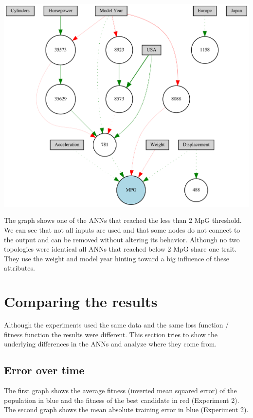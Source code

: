 \documentclass{llncs}
\begin{document}
\newline
\newline
\begin{center}
	\includegraphics[scale=0.45]{Topologie.png}
	\newline
\end{center}

%
The graph shows one of the ANNs that reached the less than 2 MpG threshold. We can see that not all inputs are used and that some nodes do not connect to the output and can be removed without altering its behavior. Although no two topologies were identical all ANNs that reached below 2 MpG share one trait. They use the weight and model year hinting toward a big influence of these attributes. 
%
\section{Comparing the results}
%
Although the experiments used the same data and the same loss function / fitness function the results were different. This section tries to show the underlying differences in the ANNs and analyze where they come from. 
%
\subsection{Error over time}
%
The first graph shows the average fitness (inverted mean squared error) of the population in blue and the fitness of the best candidate in red (Experiment 2). The second graph shows the mean absolute training error in blue (Experiment 2).
%
\newline
\end{document}
